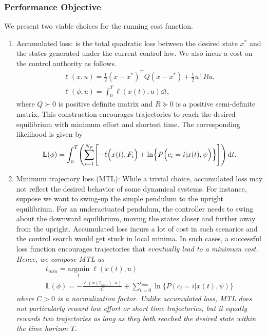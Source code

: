 \subsubsection{Performance Objective}
\label{sssec:performance_objective}
%
We present two viable choices for the running cost function. 
\begin{enumerate}
    \item Accumulated loss: is the total quadratic loss between the desired
    state $x^*$ and the states generated under the current control law. We also
    incur a cost on the control authority as follows.
    \begin{equation}
        \begin{gathered}
            \ell(x, u) = \frac{1}{2}(x - x^*)^\top Q (x - x^*) + \frac{1}{2} u^\top R u , \\
            \ell(\phi, u) = \int_0^{T}  \ell(x(t), u)\dd t,
        \end{gathered}
    \label{eq:accumulatedLoss}
    \end{equation}
    \noindent where $Q \succ 0$ is positive definite matrix and $R \succeq 0$ is
    a positive semi-definite matrix.
    This construction encourages trajectories to reach the desired equilibrium
    with minimum effort and shortest time.
    The corresponding likelihood is given by 
    \begin{align}
        \mathbb{L}(\phi) = \int_{0}^{T} \Biggl( \sum_{i=1}^{N_F} \Biggl[ - \ell \Bigl(x(t), F_i \Bigr) + \ln \Bigl\{ P\Bigl(c_i = i | x(t), \psi \Bigr)  \Bigr\} \Biggr] \Biggr) \operatorname{d}\! t.
        \label{eq:accumulated_likelihood}
    \end{align}
    \item Minimum trajectory loss (MTL): While a trivial choice, accumulated
    loss may not reflect the desired behavior of some dynamical systems.
    For instance, suppose we want to swing-up the simple pendulum to the upright
    equilibrium. 
    For an underactuated pendulum, the controller needs to swing about the
    downward equilibrium, moving the states closer and further away from the
    upright.
    Accumulated loss incurs a lot of cost in such scenarios and the control
    search would get stuck in local minima.
    In such cases, a successful loss function encourages trajectories that
    \it{eventually} \normalfont lead to a minimum cost.
    Hence, we compose MTL as
    \begin{equation}
        \begin{gathered}
            t_{min} = \underset{t}{\textrm{argmin}} \; \ell(x(t), u)  \\
            \mathbb{L}(\phi) = - \frac{\ell(x(t_{min}), u)}{C} + \sum_{t=0}^{t_{min}} \ln \{P(c_i=i| x(t), \psi) \} 
        \end{gathered} 
    \end{equation}
    \noindent where $C > 0$ is a normalization factor.
    Unlike accumulated loss, MTL does not particularly reward low effort or
    short time trajectories, but it equally rewards two trajectories
    as long as they both reached the desired state within the time horizon $T$. 
\end{enumerate}

